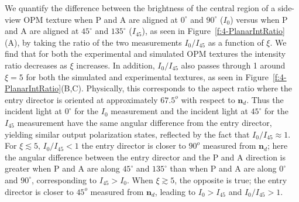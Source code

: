 We quantify the difference between the brightness of the central region of a side-view OPM texture when P and A are aligned at $0^{\circ}$ and $90^{\circ}$ ($I_0$) versus when P and A are aligned at $45^{\circ}$ and $135^{\circ}$ ($I_{45}$), as seen in Figure~\ref{f:4-PlanarIntRatio}(A), by taking the ratio of the two measurements $I_0/I_{45}$ as a function of $\xi$.
We find that for both the experimental and simulated OPM textures the intensity ratio decreases as $\xi$ increases. In addition, $I_0/I_{45}$ also passes through 1 around $\xi = 5$ for both the simulated and experimental textures, as seen in Figure~\ref{f:4-PlanarIntRatio}(B,C).
Physically, this corresponds to the aspect ratio where the entry director is oriented at approximately $67.5^o$ with respect to $\mathbf{n}_d$.
Thus the incident light at $0^{\circ}$ for the $I_0$ measurement and the incident light at $45^{\circ}$ for the $I_{45}$ measurement have the same angular difference from the entry director, yielding similar output polarization states, reflected by the fact that $I_0/I_{45} \approx 1$.
For $\xi \lesssim 5$, $I_0/I_{45} < 1$ the entry director is closer to $90^o$ measured from $\mathbf{n}_d$; here the angular difference between the entry director and the P and A direction is greater when P and A are along $45^{\circ}$ and $135^{\circ}$ than when P and A are along $0^{\circ}$ and $90^{\circ}$, corresponding to $I_{45}>I_0$.
When $\xi \gtrsim 5$, the opposite is true; the entry director is closer to $45^o$ measured from $\mathbf{n}_d$, leading to $I_{0}>I_45$ and $I_0/I_{45} > 1$.

